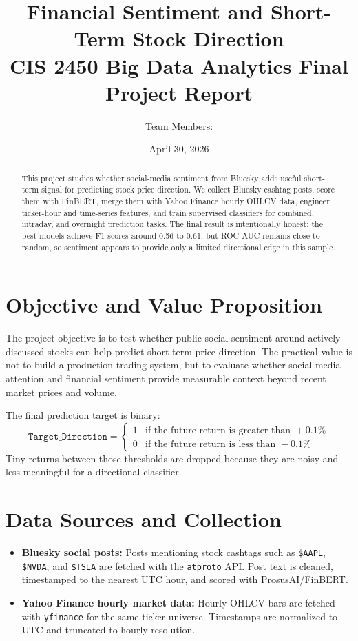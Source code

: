 \documentclass[11pt]{article}
\title{\textbf{Financial Sentiment and Short-Term Stock Direction}\\
\large CIS 2450 Big Data Analytics Final Project Report}
\author{Team Members: \underline{\hspace{2in}} \quad \underline{\hspace{2in}}}
\date{April 30, 2026}
\begin{document}
\maketitle

\begin{abstract}
This project studies whether social-media sentiment from Bluesky adds useful short-term signal for predicting stock price direction. We collect Bluesky cashtag posts, score them with FinBERT, merge them with Yahoo Finance hourly OHLCV data, engineer ticker-hour and time-series features, and train supervised classifiers for combined, intraday, and overnight prediction tasks. The final result is intentionally honest: the best models achieve F1 scores around 0.56 to 0.61, but ROC-AUC remains close to random, so sentiment appears to provide only a limited directional edge in this sample.
\end{abstract}

\section{Objective and Value Proposition}

The project objective is to test whether public social sentiment around actively discussed stocks can help predict short-term price direction. The practical value is not to build a production trading system, but to evaluate whether social-media attention and financial sentiment provide measurable context beyond recent market prices and volume.

The final prediction target is binary:
\[
\texttt{Target\_Direction} =
\begin{cases}
1 & \text{if the future return is greater than } +0.1\%\\
0 & \text{if the future return is less than } -0.1\%
\end{cases}
\]
Tiny returns between those thresholds are dropped because they are noisy and less meaningful for a directional classifier.

\section{Data Sources and Collection}

\begin{itemize}
    \item \textbf{Bluesky social posts:} Posts mentioning stock cashtags such as \texttt{\$AAPL}, \texttt{\$NVDA}, and \texttt{\$TSLA} are fetched with the \texttt{atproto} API. Post text is cleaned, timestamped to the nearest UTC hour, and scored with ProsusAI/FinBERT.
    \item \textbf{Yahoo Finance hourly market data:} Hourly OHLCV bars are fetched with \texttt{yfinance} for the same ticker universe. Timestamps are normalized to UTC and truncated to hourly resolution.
\end{itemize}
\end{document}

